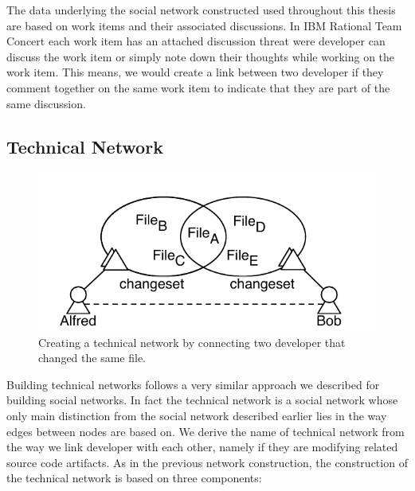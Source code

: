 The data underlying the social network constructed used throughout this thesis are based on work items and their associated discussions.
In IBM Rational Team Concert each work item has an attached discussion threat were developer can discuss the work item or simply note down their thoughts while working on the work item.
This means, we would create a link between two developer if they comment together on the same work item to indicate that they are part of the same discussion.

\subsection{Technical Network}
\begin{figure}[t!]
\centering
\includegraphics[width=.7\textwidth]{figures/cochangedfiles}
\caption{Creating a technical network by connecting two developer that changed the same file.}
\label{fig:addtechnicaledge}
\end{figure}

Building technical networks follows a very similar approach we described for building social networks.
In fact the technical network is a social network whose only main distinction from the social network described earlier lies in the way edges between nodes are based on.
We derive the name of technical network from the way we link developer with each other, namely if they are modifying related source code artifacts.
As in the previous network construction, the construction of the technical network is based on three components:

